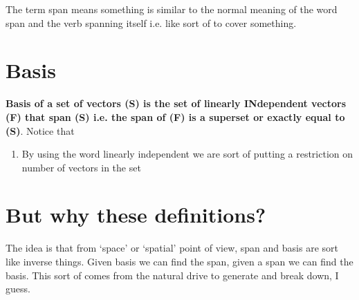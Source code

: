 \documentclass[../main.tex]{subfiles}
\begin{document}
The term span means something is similar to the normal meaning of the word span and the verb spanning itself i.e. like sort of to cover something.

\chapter{Basis}
\textbf{Basis of a set of vectors (S) is the set of linearly INdependent vectors (F) that span (S) i.e. the span of (F) is a superset or exactly equal to (S)}. Notice that
\begin{enumerate}
  \item By using the word linearly independent we are sort of putting a restriction on number of vectors in the set
\end{enumerate}

\chapter{But why these definitions?}
The idea is that from `space' or `spatial' point of view, span and basis are sort like inverse things. Given basis we can find the span, given a span we can find the basis. This sort of comes from the natural drive to generate and break down, I guess.
\end{document}
